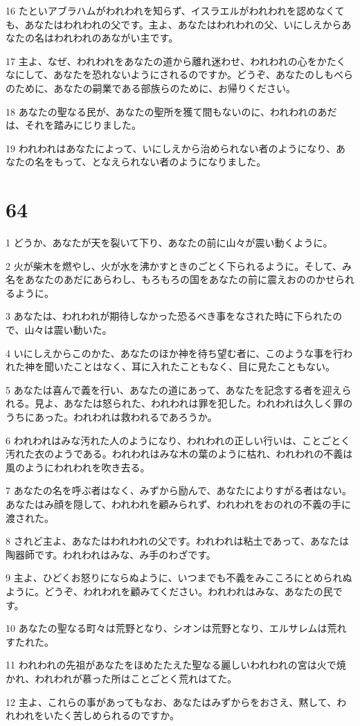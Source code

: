 \par 16 たといアブラハムがわれわれを知らず、イスラエルがわれわれを認めなくても、あなたはわれわれの父です。主よ、あなたはわれわれの父、いにしえからあなたの名はわれわれのあながい主です。
\par 17 主よ、なぜ、われわれをあなたの道から離れ迷わせ、われわれの心をかたくなにして、あなたを恐れないようにされるのですか。どうぞ、あなたのしもべらのために、あなたの嗣業である部族らのために、お帰りください。
\par 18 あなたの聖なる民が、あなたの聖所を獲て間もないのに、われわれのあだは、それを踏みにじりました。
\par 19 われわれはあなたによって、いにしえから治められない者のようになり、あなたの名をもって、となえられない者のようになりました。

\chapter{64}

\par 1 どうか、あなたが天を裂いて下り、あなたの前に山々が震い動くように。
\par 2 火が柴木を燃やし、火が水を沸かすときのごとく下られるように。そして、み名をあなたのあだにあらわし、もろもろの国をあなたの前に震えおののかせられるように。
\par 3 あなたは、われわれが期待しなかった恐るべき事をなされた時に下られたので、山々は震い動いた。
\par 4 いにしえからこのかた、あなたのほか神を待ち望む者に、このような事を行われた神を聞いたことはなく、耳に入れたこともなく、目に見たこともない。
\par 5 あなたは喜んで義を行い、あなたの道にあって、あなたを記念する者を迎えられる。見よ、あなたは怒られた、われわれは罪を犯した。われわれは久しく罪のうちにあった。われわれは救われるであろうか。
\par 6 われわれはみな汚れた人のようになり、われわれの正しい行いは、ことごとく汚れた衣のようである。われわれはみな木の葉のように枯れ、われわれの不義は風のようにわれわれを吹き去る。
\par 7 あなたの名を呼ぶ者はなく、みずから励んで、あなたによりすがる者はない。あなたはみ顔を隠して、われわれを顧みられず、われわれをおのれの不義の手に渡された。
\par 8 されど主よ、あなたはわれわれの父です。われわれは粘土であって、あなたは陶器師です。われわれはみな、み手のわざです。
\par 9 主よ、ひどくお怒りにならぬように、いつまでも不義をみこころにとめられぬように。どうぞ、われわれを顧みてください。われわれはみな、あなたの民です。
\par 10 あなたの聖なる町々は荒野となり、シオンは荒野となり、エルサレムは荒れすたれた。
\par 11 われわれの先祖があなたをほめたたえた聖なる麗しいわれわれの宮は火で焼かれ、われわれが慕った所はことごとく荒れはてた。
\par 12 主よ、これらの事があってもなお、あなたはみずからをおさえ、黙して、われわれをいたく苦しめられるのですか。

